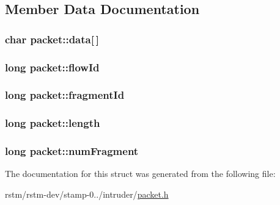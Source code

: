 \subsection{Member Data Documentation}
\hypertarget{structpacket_abc317d41c02fc51bcdd9b6192f0b0f08}{
\subsubsection[{data}]{\setlength{\rightskip}{0pt plus 5cm}char packet\-::data\mbox{[}$\,$\mbox{]}}}\label{structpacket_abc317d41c02fc51bcdd9b6192f0b0f08}
\hypertarget{structpacket_af879fccc0e322659503bf8cde85a3913}{
\subsubsection[{flow\-Id}]{\setlength{\rightskip}{0pt plus 5cm}long packet\-::flow\-Id}}\label{structpacket_af879fccc0e322659503bf8cde85a3913}
\hypertarget{structpacket_a83b2ee6e849aa55c866c280700107f5c}{
\subsubsection[{fragment\-Id}]{\setlength{\rightskip}{0pt plus 5cm}long packet\-::fragment\-Id}}\label{structpacket_a83b2ee6e849aa55c866c280700107f5c}
\hypertarget{structpacket_af19726c77735c35579195c883a0afab5}{
\subsubsection[{length}]{\setlength{\rightskip}{0pt plus 5cm}long packet\-::length}}\label{structpacket_af19726c77735c35579195c883a0afab5}
\hypertarget{structpacket_a38c53edee9d6c5510cbc992e0aa6b02d}{
\subsubsection[{num\-Fragment}]{\setlength{\rightskip}{0pt plus 5cm}long packet\-::num\-Fragment}}\label{structpacket_a38c53edee9d6c5510cbc992e0aa6b02d}


The documentation for this struct was generated from the following file\-:\begin{DoxyCompactItemize}
\item 
rstm/rstm-\/dev/stamp-\/0../intruder/\hyperlink{packet_8h}{packet.\-h}\end{DoxyCompactItemize}
